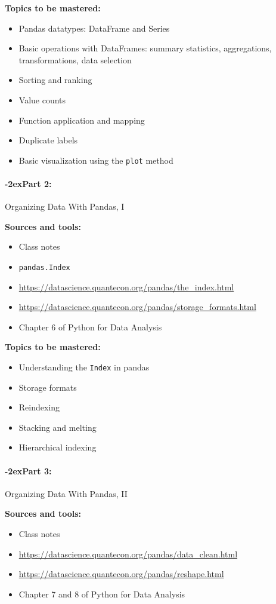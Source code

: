 \documentclass[11pt]{article}
\newcommand{\module}[1]{%
    \paragraph*{\kern-2ex\quad #1:}
  }
\begin{document}
  {\bf Topics to be mastered:}
  \begin{itemize}
    \item Pandas datatypes: DataFrame and Series
    \item Basic operations with DataFrames: summary statistics, aggregations,
    transformations, data selection
    \item Sorting and ranking
    \item Value counts
    \item Function application and mapping
    \item Duplicate labels
    \item Basic visualization using the \texttt{plot} method
  \end{itemize}

  \module{Part 2} Organizing Data With Pandas, I

  \bigskip

  {\bf Sources and tools:}
  \begin{itemize}
    \item Class notes
    \item \texttt{pandas.Index}
    \item \url{https://datascience.quantecon.org/pandas/the_index.html}
    \item \url{https://datascience.quantecon.org/pandas/storage_formats.html}
    \item Chapter 6 of Python for Data Analysis
  \end{itemize}

  {\bf Topics to be mastered:}
  \begin{itemize}
    \item Understanding the \texttt{Index} in pandas
    \item Storage formats
    \item Reindexing
    \item Stacking and melting
    \item Hierarchical indexing
  \end{itemize}

  \module{Part 3} Organizing Data With Pandas, II

  \bigskip

  {\bf Sources and tools:}
  \begin{itemize}
    \item Class notes
    \item \url{https://datascience.quantecon.org/pandas/data_clean.html}
    \item \url{https://datascience.quantecon.org/pandas/reshape.html}
    \item Chapter 7 and 8 of Python for Data Analysis
  \end{itemize}
\end{document}
